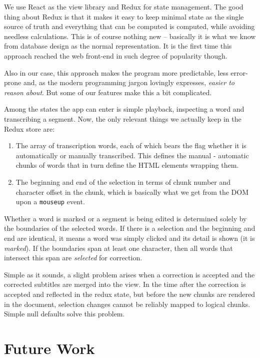 \documentclass{svproc}
\begin{document}
We use React as the view library and Redux\cite{abramov2015redux} for state
management. The good thing about Redux is that it makes it easy to keep minimal
state as the single source of truth and everything that can be computed is
computed, while avoiding needless calculations. This is of course nothing new --
basically it is what we know from database design as the normal
representation.\cite{codd1970relational} It is the first time this approach
reached the web front-end in such degree of popularity though.

Also in our case, this approach makes the program more predictable, less
error-prone and, as the modern programming jargon lovingly expresses, {\em
easier to reason about}. But some of our features make this a bit complicated.

Among the states the app can enter is simple playback, inspecting a word and
transcribing a segment. Now, the only relevant things we actually keep in the
Redux store are:

\begin{enumerate}
\item{
    The array of transcription words, each of which bears the flag whether it is
    automatically or manually transcribed. This defines the manual - automatic
    chunks of words that in turn define the HTML elements wrapping them.
}
\item{
    The beginning and end of the selection in terms of chunk number and
    character offset in the chunk, which is basically what we get from the DOM
    upon a \texttt{mouseup} event.
}
\end{enumerate}

Whether a word is marked or a segment is being edited is determined solely by
the boundaries of the selected words. If there is a selection and the beginning
and end are identical, it means a word was simply clicked and its detail is
shown (it is {\em marked}). If the boundaries span at least one character, then
all words that intersect this span are {\em selected} for correction.

Simple as it sounds, a slight problem arises when a correction is accepted and
the corrected subtitles are merged into the view. In the time after the
correction is accepted and reflected in the redux state, but before the new
chunks are rendered in the document, selection changes cannot be reliably mapped
to logical chunks. Simple null defaults solve this problem.

\section{Future Work}
\end{document}

